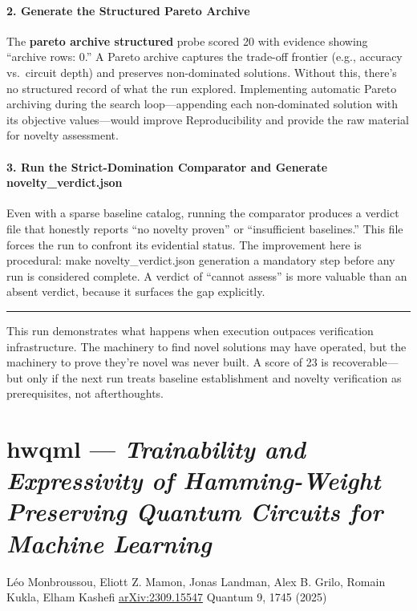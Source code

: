 \documentclass[10pt,letterpaper]{article}
\begin{document}
\hypertarget{generate-the-structured-pareto-archive}{%
\paragraph{2. Generate the Structured Pareto Archive}\label{generate-the-structured-pareto-archive}}

The \textbf{pareto archive structured} probe scored 20 with evidence showing ``archive rows: 0.'' A Pareto archive captures the trade-off frontier (e.g., accuracy vs.~circuit depth) and preserves non-dominated solutions. Without this, there's no structured record of what the run explored. Implementing automatic Pareto archiving during the search loop---appending each non-dominated solution with its objective values---would improve Reproducibility and provide the raw material for novelty assessment.

\hypertarget{run-the-strict-domination-comparator-and-generate-novelty_verdict.json}{%
\paragraph{3. Run the Strict-Domination Comparator and Generate novelty\_verdict.json}\label{run-the-strict-domination-comparator-and-generate-novelty_verdict.json}}

Even with a sparse baseline catalog, running the comparator produces a verdict file that honestly reports ``no novelty proven'' or ``insufficient baselines.'' This file forces the run to confront its evidential status. The improvement here is procedural: make novelty\_verdict.json generation a mandatory step before any run is considered complete. A verdict of ``cannot assess'' is more valuable than an absent verdict, because it surfaces the gap explicitly.

\begin{center}\rule{0.5\linewidth}{0.5pt}\end{center}

This run demonstrates what happens when execution outpaces verification infrastructure. The machinery to find novel solutions may have operated, but the machinery to prove they're novel was never built. A score of 23 is recoverable---but only if the next run treats baseline establishment and novelty verification as prerequisites, not afterthoughts.


\clearpage
\section{hwqml --- \emph{Trainability and Expressivity of Hamming-Weight Preserving Quantum Circuits for Machine Learning}}
\noindent Léo Monbroussou, Eliott Z. Mamon, Jonas Landman, Alex B. Grilo, Romain Kukla, Elham Kashefi \quad \href{https://arxiv.org/abs/2309.15547}{arXiv:2309.15547} \quad Quantum 9, 1745 (2025)
\end{document}
